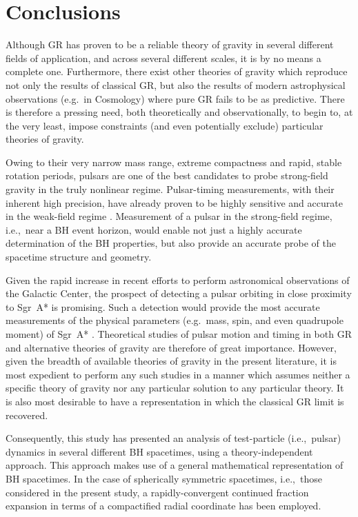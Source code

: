 \documentclass[a4paper,aps,twocolumn,showpacs,showkeys,nofootinbib,preprintnumbers,superscriptaddress,amsmath,amssymb,amsfonts]{revtex4-1}
\newcommand{\ie}{{i.e.,}~}
\begin{document}
\section{Conclusions} 
\label{sette}
Although GR has proven to be a reliable theory of gravity in several
different fields of application, and across several different scales,
it is by no means a complete one.
Furthermore, there exist other theories of gravity which
reproduce not only the results of classical GR, but also
the results of modern astrophysical observations (e.g.~in Cosmology) 
where pure GR fails to be as predictive.
There is therefore a pressing need, both theoretically and
observationally, to begin to, at the very least, impose constraints
(and even potentially exclude) particular theories of gravity.

Owing to their very narrow mass range, extreme compactness and
rapid, stable rotation periods, pulsars are one of the best candidates
to probe strong-field gravity in the truly nonlinear regime.
Pulsar-timing measurements, with their inherent high
precision, have already proven to be highly sensitive and accurate
in the weak-field regime \cite{Manchester2013}.
Measurement of a pulsar in the strong-field regime, \ie near a BH
event horizon, would enable not just a highly accurate determination of
the BH properties, but also provide an accurate probe of the spacetime
structure and geometry.

Given the rapid increase in recent efforts to perform astronomical
observations of the Galactic Center, the prospect of detecting a pulsar
orbiting in close proximity to Sgr~A* is promising.
Such a detection would provide the most accurate measurements of
the physical parameters (e.g.~mass, spin, and even quadrupole moment)
of Sgr~A* \cite{Psaltis2016}.
Theoretical studies of pulsar motion and timing in both GR and alternative
theories of gravity are therefore of great importance.
However, given the breadth of available theories of gravity in the present
literature, it is most expedient to perform any such studies in a manner
which assumes neither a specific theory of gravity nor any particular
solution to any particular theory.
It is also most desirable to have a representation in which the classical
GR limit is recovered.

Consequently, this study has presented an analysis of
test-particle (\ie pulsar) dynamics in several different BH spacetimes,
using a theory-independent approach.
This approach makes use of a general mathematical representation of
BH spacetimes.
In the case of spherically symmetric spacetimes,
\ie those considered in the present study,
a rapidly-convergent continued fraction expansion in terms of a
compactified radial coordinate has been employed.
\end{document}
